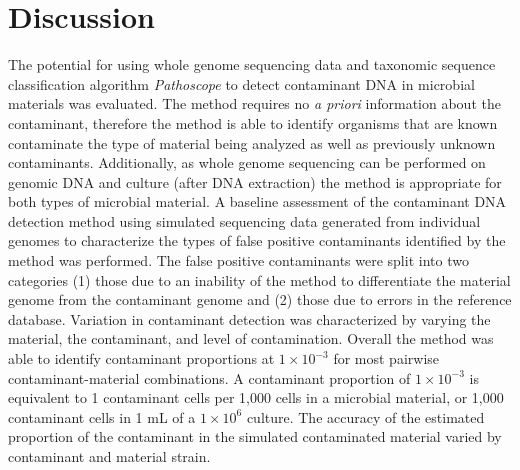 \documentclass[fleqn,10pt,lineno]{wlpeerj}\usepackage[]{graphicx}\usepackage[]{color}
\begin{document}
\section*{Discussion}

The potential for using whole genome sequencing data and taxonomic sequence classification algorithm \textit{Pathoscope} to detect contaminant DNA in microbial materials was evaluated. 
The method requires no \textit{a priori} information about the contaminant, therefore the method is able to identify organisms that are known contaminate the type of material being analyzed as well as previously unknown contaminants. 
Additionally, as whole genome sequencing can be performed on genomic DNA and culture (after DNA extraction) the method is appropriate for both types of microbial material.
A baseline assessment of the contaminant DNA detection method using simulated sequencing data generated from individual genomes to characterize the types of false positive contaminants identified by the method was performed. 
The false positive contaminants were split into two categories (1) those due to an inability of the method to differentiate the material genome from the contaminant genome and (2) those due to errors in the reference database. 
Variation in contaminant detection was characterized by varying the material, the contaminant, and level of contamination. 
Overall the method was able to identify contaminant proportions at $1 \times 10^{-3}$ for most pairwise contaminant-material combinations. 
A contaminant proportion of $1 \times 10^{-3}$ is equivalent to 1 contaminant cells per 1,000 cells in a microbial material, or 1,000 contaminant cells in 1 mL of a $1 \times 10^{6}$ culture.
The accuracy of the estimated proportion of the contaminant in the simulated contaminated material varied by contaminant and material strain. 
\end{document}
